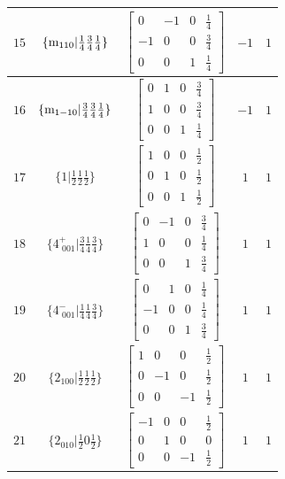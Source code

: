\documentclass[fleqn,8pt]{jsarticle}
\begin{document}
\begin{longtable}{ccccc}
$ 15 $ & $ \{{\rm m}_{110}|\frac{1}{4} \frac{3}{4} \frac{1}{4}\} $ & $ \begin{bmatrix} 0 & -1 & 0 & \frac{1}{4} \\ -1 & 0 & 0 & \frac{3}{4} \\ 0 & 0 & 1 & \frac{1}{4} \end{bmatrix} $ & $ -1 $ & $ 1 $ \\ \hline
$ 16 $ & $ \{{\rm m}_{1-10}|\frac{3}{4} \frac{3}{4} \frac{1}{4}\} $ & $ \begin{bmatrix} 0 & 1 & 0 & \frac{3}{4} \\ 1 & 0 & 0 & \frac{3}{4} \\ 0 & 0 & 1 & \frac{1}{4} \end{bmatrix} $ & $ -1 $ & $ 1 $ \\ \hline
$ 17 $ & $ \{1|\frac{1}{2} \frac{1}{2} \frac{1}{2}\} $ & $ \begin{bmatrix} 1 & 0 & 0 & \frac{1}{2} \\ 0 & 1 & 0 & \frac{1}{2} \\ 0 & 0 & 1 & \frac{1}{2} \end{bmatrix} $ & $ 1 $ & $ 1 $ \\ \hline
$ 18 $ & $ \{4^{+}_{\,\,001}|\frac{3}{4} \frac{1}{4} \frac{3}{4}\} $ & $ \begin{bmatrix} 0 & -1 & 0 & \frac{3}{4} \\ 1 & 0 & 0 & \frac{1}{4} \\ 0 & 0 & 1 & \frac{3}{4} \end{bmatrix} $ & $ 1 $ & $ 1 $ \\ \hline
$ 19 $ & $ \{4^{-}_{\,\,001}|\frac{1}{4} \frac{1}{4} \frac{3}{4}\} $ & $ \begin{bmatrix} 0 & 1 & 0 & \frac{1}{4} \\ -1 & 0 & 0 & \frac{1}{4} \\ 0 & 0 & 1 & \frac{3}{4} \end{bmatrix} $ & $ 1 $ & $ 1 $ \\ \hline
$ 20 $ & $ \{2{}_{100}|\frac{1}{2} \frac{1}{2} \frac{1}{2}\} $ & $ \begin{bmatrix} 1 & 0 & 0 & \frac{1}{2} \\ 0 & -1 & 0 & \frac{1}{2} \\ 0 & 0 & -1 & \frac{1}{2} \end{bmatrix} $ & $ 1 $ & $ 1 $ \\ \hline
$ 21 $ & $ \{2{}_{010}|\frac{1}{2} 0 \frac{1}{2}\} $ & $ \begin{bmatrix} -1 & 0 & 0 & \frac{1}{2} \\ 0 & 1 & 0 & 0 \\ 0 & 0 & -1 & \frac{1}{2} \end{bmatrix} $ & $ 1 $ & $ 1 $ \\ \hline

\end{longtable}
\end{document}
